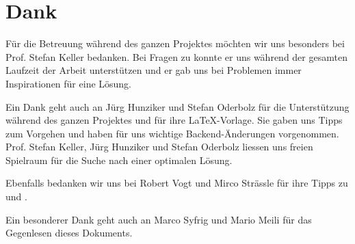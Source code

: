 \chapter*{Dank}
\thispagestyle{scrheadings}

Für die Betreuung während des ganzen Projektes möchten wir uns besonders bei Prof. Stefan Keller  bedanken.
Bei Fragen zu  konnte er uns während der gesamten Laufzeit der Arbeit unterstützen und er gab uns bei Problemen immer Inspirationen für eine Lösung. 

Ein Dank geht auch an Jürg Hunziker und Stefan Oderbolz für die Unterstützung während des ganzen Projektes und für ihre \LaTeX{}-Vorlage.
Sie gaben uns Tipps zum Vorgehen und haben für uns wichtige Backend-Änderungen vorgenommen. 
Prof. Stefan Keller, Jürg Hunziker und Stefan Oderbolz liessen uns freien Spielraum für die Suche nach einer optimalen Lösung.

Ebenfalls bedanken wir uns bei Robert Vogt und Mirco Strässle für ihre Tipps zu  und .

Ein besonderer Dank geht auch an Marco Syfrig und Mario Meili für das Gegenlesen dieses Dokuments.